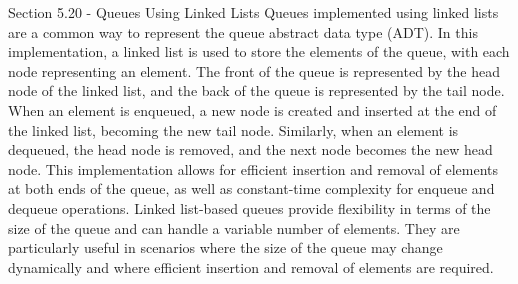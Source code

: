 \begin{notes}{Section 5.20 - Queues Using Linked Lists}
    Queues implemented using linked lists are a common way to represent the queue abstract data type (ADT). In this implementation, a linked list is used to store the elements of the queue, with each node representing an element. The front of the queue is represented by the head node of the linked list, and the back of the queue is represented by the tail node. When an element is enqueued, 
    a new node is created and inserted at the end of the linked list, becoming the new tail node. Similarly, when an element is dequeued, the head node is removed, and the next node becomes the new head node. This implementation allows for efficient insertion and removal of elements at both ends of the queue, as well as constant-time complexity for enqueue and dequeue operations. Linked list-based 
    queues provide flexibility in terms of the size of the queue and can handle a variable number of elements. They are particularly useful in scenarios where the size of the queue may change dynamically and where efficient insertion and removal of elements are required.
\end{notes}


